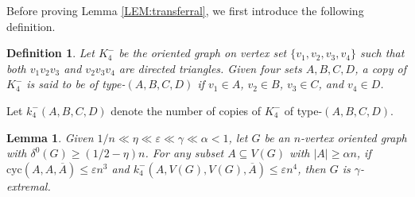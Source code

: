 \documentclass[11pt,a4paper,reqno]{amsart}
\newtheorem{definition}{Definition}
\newtheorem{lemma}[theorem]{Lemma}
\theoremstyle{definition} %
\begin{document}
Before proving Lemma \ref{LEM:transferral}, we first introduce the following definition.

\begin{definition}
    Let $K^-_4$ be the oriented graph on vertex set $\{v_1,v_2,v_3,v_4\}$ such that both $v_1v_2v_3$ and $v_2v_3v_4$ are directed triangles. 
    Given four sets $A,B,C,D$, a copy of $K^-_4$ is said to be of type-$(A,B,C,D)$ if $v_1\in A$, $v_2\in B$, $v_3\in C$, and $v_4\in D$.
\end{definition}

Let $k_4^-(A,B,C,D)$ denote the number of copies of $K^-_4$ of type-$(A,B,C,D)$.

\begin{lemma}\label{LEM:triangle to extremal}
    Given $1/n\ll\eta\ll\varepsilon \ll \gamma \ll \alpha< 1$, let $G$ be an $n$-vertex oriented graph with $\delta^0(G)\geqslant(1/2-\eta)n$. For any subset $A\subseteq V(G)$ with $|A|\geqslant\alpha n$, if $\text{cyc}(A,A,\overline{A})\leqslant\varepsilon n^3$ and $k_4^-(A,V(G),V(G),\overline{A})\leqslant \varepsilon n^4$, then $G$ is $\gamma$-extremal.
\end{lemma}
\end{document}
